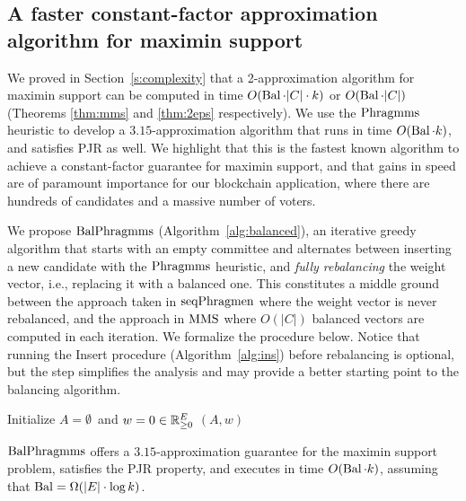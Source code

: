 \subsection{A faster constant-factor approximation algorithm for maximin support}\label{s:315}

We proved in Section~\ref{s:complexity} that a 2-approximation algorithm for maximin support can be computed in time $O(\operatorname{Bal}\cdot |C|\cdot k)$ or $O(\operatorname{Bal}\cdot |C|)$ (Theorems \ref{thm:mms} and \ref{thm:2eps} respectively). 
We use the $\operatorname{Phragmms}$ heuristic to develop a $3.15$-approximation algorithm that runs in time $O(\operatorname{Bal}\cdot k)$, and satisfies PJR as well. 
We highlight that this is the fastest known algorithm to achieve a constant-factor guarantee for maximin support, and that gains in speed are of paramount importance for our blockchain application, where there are hundreds of candidates and a massive number of voters.

We propose $\balanced$ (Algorithm~\ref{alg:balanced}), an iterative greedy algorithm that starts with an empty committee and alternates between inserting a new candidate with the $\operatorname{Phragmms}$ heuristic, and \emph{fully rebalancing} the weight vector, i.e., replacing it with a balanced one. This constitutes a middle ground between the approach taken in $\operatorname{seqPhragmen}$ where the weight vector is never rebalanced, and the approach in $\operatorname{MMS}$ where $O(|C|)$ balanced vectors are computed in each iteration. 
We formalize the procedure below. Notice that running the Insert procedure (Algorithm~\ref{alg:ins}) before rebalancing is optional, but the step simplifies the analysis and may provide a better starting point to the balancing algorithm.

\begin{algorithm}[htb]\label{alg:balanced}
\SetAlgoLined
{}
Initialize $A=\emptyset$\ and $w=0\in\mathbb{R}_{\geq 0}^E$\;
\Return $(A,w)$\;
\caption{$\balanced$}
\end{algorithm}

\begin{theorem}\label{thm:315}
$\balanced$ offers a $3.15$-approximation guarantee for the maximin support problem, satisfies the PJR property, and executes in time $O(\operatorname{Bal}\cdot k)$, assuming that $\operatorname{Bal}= \Omega(|E|\cdot \log k)$.
\end{theorem}

